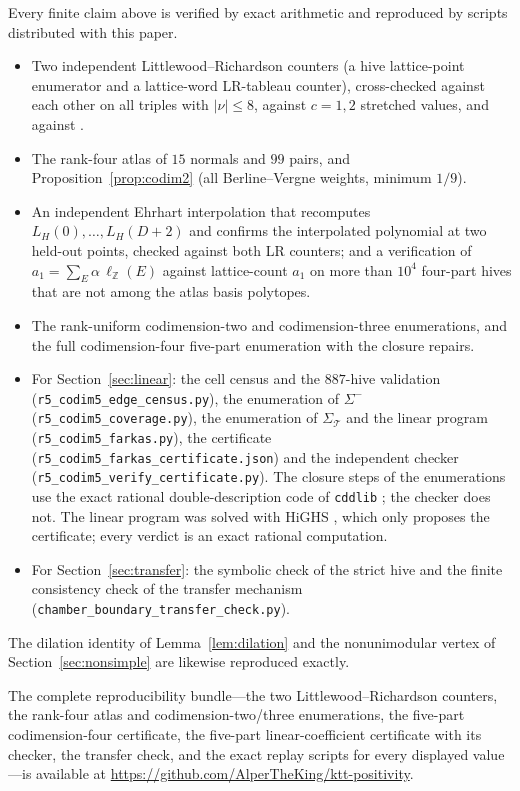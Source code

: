 \documentclass[11pt]{amsart}
\theoremstyle{definition}
\newcommand{\Z}{\mathbb{Z}}
\begin{document}
Every finite claim above is verified by exact arithmetic and reproduced by
scripts distributed with this paper.
\begin{itemize}
\item Two independent Littlewood--Richardson counters (a hive lattice-point
enumerator and a lattice-word LR-tableau counter), cross-checked against each
other on all triples with $|\nu|\le 8$, against $c=1,2$ stretched values, and
against \cite{lrcalc}.
\item The rank-four atlas of $15$ normals and $99$ pairs, and
Proposition~\ref{prop:codim2} (all Berline--Vergne weights, minimum $1/9$).
\item An independent Ehrhart interpolation that recomputes $L_H(0),\dots,L_H(D+2)$
and confirms the interpolated polynomial at two held-out points, checked against
both LR counters; and a verification of $a_1=\sum_E\alpha\,\ell_{\Z}(E)$ against
lattice-count $a_1$ on more than $10^4$ four-part hives that are not among the
atlas basis polytopes.
\item The rank-uniform codimension-two and codimension-three enumerations, and
the full codimension-four five-part enumeration with the closure repairs.
\item For Section~\ref{sec:linear}: the cell census and the $887$-hive
validation (\texttt{r5\_codim5\_edge\_census.py}), the enumeration of
$\Sigma^{-}$ (\texttt{r5\_codim5\_coverage.py}), the enumeration of
$\Sigma_{\mathcal T}$ and the linear program (\texttt{r5\_codim5\_farkas.py}),
the certificate (\texttt{r5\_codim5\_farkas\_certificate.json}) and the
independent checker (\texttt{r5\_codim5\_verify\_certificate.py}). The
closure steps of the enumerations use the exact rational double-description
code of \texttt{cddlib} \cite{cddlib}; the checker does not. The linear
program was solved with HiGHS \cite{HiGHS}, which only proposes the
certificate; every verdict is an exact rational computation.
\item For Section~\ref{sec:transfer}: the symbolic check of the strict hive and
the finite consistency check of the transfer mechanism
(\texttt{chamber\_boundary\_transfer\_check.py}).
\end{itemize}
The dilation identity of Lemma~\ref{lem:dilation} and the nonunimodular vertex of
Section~\ref{sec:nonsimple} are likewise reproduced exactly.

The complete reproducibility bundle---the two Littlewood--Richardson counters,
the rank-four atlas and codimension-two/three enumerations, the five-part
codimension-four certificate, the five-part linear-coefficient certificate with
its checker, the transfer check, and the exact replay scripts for every
displayed value---is available at
\url{https://github.com/AlperTheKing/ktt-positivity}.
\end{document}
